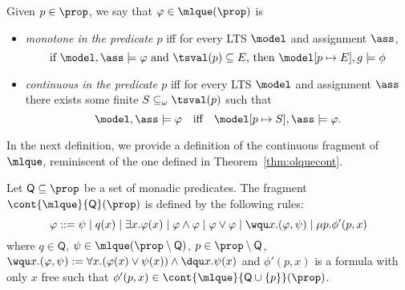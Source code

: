 %
%
\begin{definition}
Given $p \in \prop$, we say that $\varphi \in \mlque(\prop)$ is
\begin{itemize}
\item \emph{monotone in the predicate $p$} iff for every LTS $\model$ and assignment $\ass$, \[ \text{if }\model, \ass \models \varphi \text{ and $\tsval(p) \subseteq E$, then }\model[p \mapsto E], g\models \phi\]

\item \emph{continuous in the predicate $p$} iff for every LTS $\model$ and assignment $\ass$ there exists some finite $S \subseteq_\omega \tsval(p)$ such that
$$
\model, \ass \models \varphi \quad\text{iff}\quad \model[p \mapsto S], \ass \models \varphi .
$$
\end{itemize}
\end{definition}

In the next definition, we provide a definition of the continuous fragment of $\mlque$, reminiscent of the one defined in Theorem~\ref{thm:olquecont}.
\begin{definition}
Let $\mathsf{Q}\subseteq \prop$ be a set of monadic predicates. The fragment $\cont{\mlque}{\mathsf{Q}}(\prop)$ is defined by the following rules:
$$
\varphi ::= \psi \mid q(x) \mid \exists x.\varphi(x) \mid \varphi \land \varphi \mid \varphi \lor \varphi \mid \wqu x.(\varphi,\psi) \mid \mu p. \phi'(p, x)
$$
where $q \in \mathsf{Q}$, $\psi \in \mlque(\prop\setminus \mathsf{Q})$, $p \in \prop \setminus \mathsf{Q}$, $\wqu x.(\varphi,\psi) := \forall x.(\varphi(x) \lor \psi(x)) \land \dqu x.\psi(x)$ and $\phi'(p,x)$ is a formula with only $x$ free such that $\phi'(p,x) \in \cont{\mlque}{\mathsf{Q} \cup\{p\}}(\prop)$.

\end{definition}

